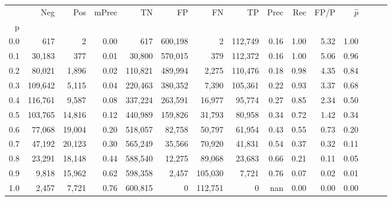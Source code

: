 \begin{tabular}{rrrrrrrrrrrrrrr}
\toprule
{} &      Neg &     Pos & mPrec &       TN &       FP &       FN &       TP &  Prec &   Rec &  FP/P & $\hat{p}$ \\
p   &          &         &       &          &          &          &          &       &       &       &           \\
\midrule
0.0 &      617 &       2 &  0.00 &      617 &  600,198 &        2 &  112,749 &  0.16 &  1.00 &  5.32 &      1.00 \\
0.1 &   30,183 &     377 &  0.01 &   30,800 &  570,015 &      379 &  112,372 &  0.16 &  1.00 &  5.06 &      0.96 \\
0.2 &   80,021 &   1,896 &  0.02 &  110,821 &  489,994 &    2,275 &  110,476 &  0.18 &  0.98 &  4.35 &      0.84 \\
0.3 &  109,642 &   5,115 &  0.04 &  220,463 &  380,352 &    7,390 &  105,361 &  0.22 &  0.93 &  3.37 &      0.68 \\
0.4 &  116,761 &   9,587 &  0.08 &  337,224 &  263,591 &   16,977 &   95,774 &  0.27 &  0.85 &  2.34 &      0.50 \\
0.5 &  103,765 &  14,816 &  0.12 &  440,989 &  159,826 &   31,793 &   80,958 &  0.34 &  0.72 &  1.42 &      0.34 \\
0.6 &   77,068 &  19,004 &  0.20 &  518,057 &   82,758 &   50,797 &   61,954 &  0.43 &  0.55 &  0.73 &      0.20 \\
0.7 &   47,192 &  20,123 &  0.30 &  565,249 &   35,566 &   70,920 &   41,831 &  0.54 &  0.37 &  0.32 &      0.11 \\
0.8 &   23,291 &  18,148 &  0.44 &  588,540 &   12,275 &   89,068 &   23,683 &  0.66 &  0.21 &  0.11 &      0.05 \\
0.9 &    9,818 &  15,962 &  0.62 &  598,358 &    2,457 &  105,030 &    7,721 &  0.76 &  0.07 &  0.02 &      0.01 \\
1.0 &    2,457 &   7,721 &  0.76 &  600,815 &        0 &  112,751 &        0 &   nan &  0.00 &  0.00 &      0.00 \\
\bottomrule
\end{tabular}
